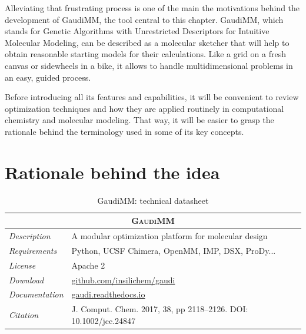 Alleviating that frustrating process is one of the main the motivations behind the development of GaudiMM, the tool central to this chapter. GaudiMM, which stands for Genetic Algorithms with Unrestricted Descriptors for Intuitive Molecular Modeling, can be described as a molecular sketcher that will help to obtain reasonable starting models for their calculations. Like a grid on a fresh canvas or sidewheels in a bike, it allows to handle multidimensional problems in an easy, guided process.


Before introducing all its features and capabilities, it will be convenient to review  optimization techniques and how they are applied routinely in computational chemistry and molecular modeling. That way, it will be easier to grasp the rationale behind the terminology used in some of its key concepts.

\section{Rationale behind the idea}



\begin{table}[hbtp]
	\caption{GaudiMM: technical datasheet}
	\footnotesize
	\newcommand{\tableheading}[1]{\multicolumn{2}{c}{\textsc{#1}}}
	\begin{tabularx}{\textwidth}{RL}
		\toprule
		\tableheading{GaudiMM} \\
		\toprule
		\textit{Description} & A modular optimization platform for molecular design \\
		\midrule
		\textit{Requirements} & Python, UCSF Chimera, OpenMM, IMP, DSX, ProDy... \\
		\midrule
		\textit{License} & Apache 2 \\
		\midrule
		\textit{Download} & \href{https://github.com/insilichem/gaudi}{github.com/insilichem/gaudi} \\
		\midrule
		\textit{Documentation} & \href{https://gaudi.readthedocs.io}{gaudi.readthedocs.io} \\
		\midrule
		\textit{Citation} & J. Comput. Chem. 2017, 38, pp 2118–2126. DOI: 10.1002/jcc.24847 \\
		\bottomrule

	\end{tabularx}
\end{table}


